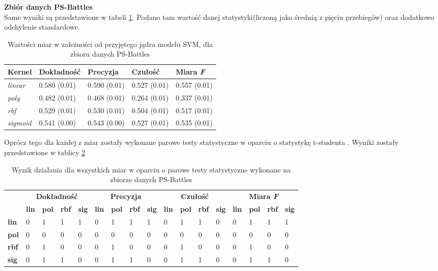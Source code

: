 \textbf{Zbiór danych PS-Battles} \\

Same wyniki są przedstawione w tabeli \ref{tab:result_p}. Podano tam wartość danej statystyki(liczoną jako średnią z pięciu przebiegów) oraz dodatkowo odchylenie standardowe.
\begin{table}[h!]
	\centering
	\begin{tabular}{|l|l|l|l|l|}
		\hline
		\textbf{Kernel} & \textbf{Dokładność} & \textbf{Precyzja} & \textbf{Czułość} & \textbf{Miara \textit{F}} \\ \hline
		\textit{linear}  & 0.580 (0.01) & 0.590 (0.01) & 0.527 (0.01) & 0.557 (0.01) \\ \hline
		\textit{poly}    & 0.482 (0.01) & 0.468 (0.01) & 0.264 (0.01) & 0.337 (0.01) \\ \hline
		\textit{rbf}     & 0.529 (0.01) & 0.530 (0.01) & 0.504 (0.01) & 0.517 (0.01) \\ \hline
		\textit{sigmoid} & 0.541 (0.00) & 0.543 (0.00) & 0.527 (0.01) & 0.535 (0.01) \\ \hline
	\end{tabular}
	\caption{Wartości miar w zależności od przyjętego jądra modelu SVM, dla zbioru danych PS-Battles}
	\label{tab:result_p}
\end{table}

Oprócz tego dla każdej z miar zostały wykonane parowe testy statystyczne w oparciu o statystykę t-studenta \cite{stata}. Wyniki zostały przedstawione w tablicy \ref{tab:result_pp}

\begin{table}[h!]
	\centering
	\begin{tabular}{l|l|l|l|l|l|l|l|l|l|l|l|l|l|l|l|l|}
		\cline{2-17}
		&
		\multicolumn{4}{c|}{\textbf{Dokładność}} &
		\multicolumn{4}{c|}{\textbf{Precyzja}} &
		\multicolumn{4}{c|}{\textbf{Czułość}} &
		\multicolumn{4}{c|}{\textbf{Miara \textit{F}}} \\ \cline{2-17} 
		\textbf{} &
		\textbf{lin} &
		\textbf{pol} &
		\textbf{rbf} &
		\textbf{sig} &
		\textbf{lin} &
		\textbf{pol} &
		\textbf{rbf} &
		\textbf{sig} &
		\textbf{lin} &
		\textbf{pol} &
		\textbf{rbf} &
		\textbf{sig} &
		\textbf{lin} &
		\textbf{pol} &
		\textbf{rbf} &
		\textbf{sig} \\ \hline
		\multicolumn{1}{|l|}{\textbf{lin}}  & 0 & 1 & 1 & 1 & 0 & 1 & 1 & 1 & 0 & 1 & 1 & 0 & 0 & 1 & 1 & 1 \\ \hline
		\multicolumn{1}{|l|}{\textbf{pol}}    & 0 & 0 & 0 & 0 & 0 & 0 & 0 & 0 & 0 & 0 & 0 & 0 & 0 & 0 & 0 & 0 \\ \hline
		\multicolumn{1}{|l|}{\textbf{rbf}}     & 0 & 1 & 0 & 0 & 0 & 1 & 0 & 0 & 0 & 1 & 0 & 0 & 0 & 1 & 0 & 0 \\ \hline
		\multicolumn{1}{|l|}{\textbf{sig}} & 0 & 1 & 1 & 0 & 0 & 1 & 1 & 0 & 0 & 1 & 1 & 0 & 0 & 1 & 1 & 0 \\ \hline
	\end{tabular}
	\caption{Wynik działania dla wszystkich miar w oparciu o parowe testy statystyczne wykonane na zbiorze danych PS-Battles }
	\label{tab:result_pp}
\end{table}

